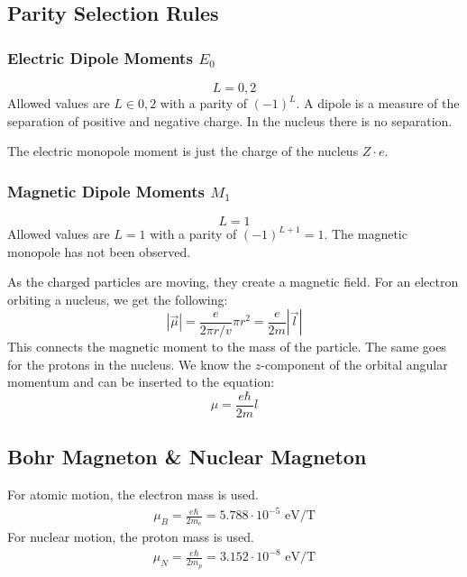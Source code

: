 \subsection{Parity Selection Rules}
\subsubsection{Electric Dipole Moments $E_0$}
\begin{equation}
  L = 0, 2
\end{equation}
Allowed values are $L ∈ {0,2}$ with a parity of $(-1)^{L}$. A dipole is a measure of the separation of positive and negative charge. In the nucleus there is no separation. 

The electric monopole moment is just the charge of the nucleus $Z ⋅ e$.


\subsubsection{Magnetic Dipole Moments $M_1$}
\begin{equation}
  L = 1
\end{equation}
Allowed values are $L = 1$ with a parity of $(-1)^{L+1} = 1$. The magnetic monopole has not been observed. 

As the charged particles are moving, they create a magnetic field. For an electron orbiting a nucleus, we get the following:
\begin{equation}
  \left|\vec{μ}\right| = \frac{e}{2πr / v} πr^2 = \frac{e}{2m}\left|\vec{l}\right|
\end{equation}
This connects the magnetic moment to the mass of the particle. The same goes for the protons in the nucleus. We know the $z$-component of the orbital angular momentum and can be inserted to the equation:
\begin{equation}
  μ = \frac{eℏ}{2m}l
\end{equation}
\subsection{Bohr Magneton \& Nuclear Magneton}
For atomic motion, the electron mass is used.
\begin{align}
μ_{B} = \frac{eℏ}{2m_{e}}  = 5.788 ⋅ 10^{-5} \text{ eV/T}
\end{align}
For nuclear motion, the proton mass is used.
\begin{align}
μ_{N} = \frac{eℏ}{2m_{p}}  = 3.152 ⋅ 10^{-8} \text{ eV/T}
\end{align}

